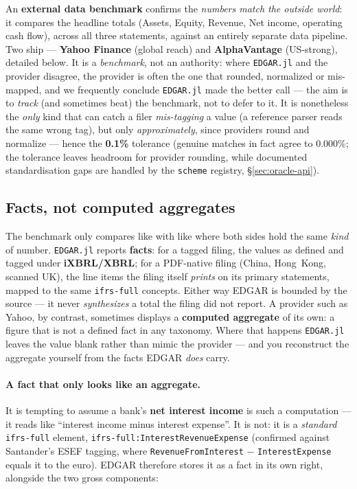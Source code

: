 \documentclass[11pt,a4paper]{report}
\begin{document}
An \textbf{external data benchmark} confirms the \emph{numbers match the outside world}: it compares the
headline totals (Assets, Equity, Revenue, Net income, operating cash flow), across all three statements,
against an entirely separate data pipeline. Two ship --- \textbf{Yahoo Finance} (global reach) and
\textbf{AlphaVantage} (US-strong), detailed below. It is a \emph{benchmark}, not an authority: where
\texttt{EDGAR.jl} and the provider disagree, the provider is often the one that rounded, normalized or
mis-mapped, and we frequently conclude \texttt{EDGAR.jl} made the better call --- the aim is to \emph{track}
(and sometimes beat) the benchmark, not to defer to it. It is nonetheless the \emph{only} kind that can catch
a filer \emph{mis-tagging} a value (a reference parser reads the same wrong tag), but only
\emph{approximately}, since providers round and normalize --- hence the \textbf{0.1\%} tolerance (genuine
matches in fact agree to \(0.000\%\); the tolerance leaves headroom for provider rounding, while documented
standardisation gaps are handled by the \texttt{scheme} registry, \S\ref{sec:oracle-api}).

\subsection{Facts, not computed aggregates}\label{sec:benchmark-facts}

The benchmark only compares like with like where both sides hold the same \emph{kind} of number.
\texttt{EDGAR.jl} reports \textbf{facts}: for a tagged filing, the values as defined and tagged under
\textbf{iXBRL/XBRL}; for a PDF-native filing (China, Hong~Kong, scanned UK), the line items the filing itself
\emph{prints} on its primary statements, mapped to the same \texttt{ifrs-full} concepts. Either way EDGAR is
bounded by the source --- it never \emph{synthesizes} a total the filing did not report. A provider such as
Yahoo, by contrast, sometimes displays a \textbf{computed aggregate} of its own: a figure that is not a defined
fact in any taxonomy. Where that happens \texttt{EDGAR.jl} leaves the value blank rather than mimic the
provider --- and you reconstruct the aggregate yourself from the facts EDGAR \emph{does} carry.

\paragraph{A fact that only looks like an aggregate.} It is tempting to assume a bank's \textbf{net interest
income} is such a computation --- it reads like ``interest income minus interest expense''. It is not: it is a
\emph{standard} \texttt{ifrs-full} element, \texttt{ifrs-full:InterestRevenueExpense} (confirmed against
Santander's ESEF tagging, where \texttt{RevenueFromInterest} $-$ \texttt{InterestExpense} equals it to the
euro). EDGAR therefore stores it as a fact in its own right, alongside the two gross components:
\end{document}
